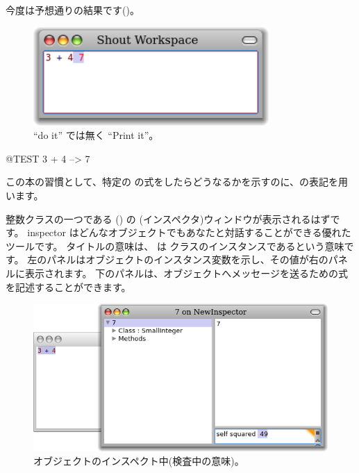 \documentclass[a4paper,10pt,twoside]{book}
\begin{document}
今度は予想通りの結果です()。

\begin{figure}[htb]
\centerline {\includegraphics[width=0.8\textwidth]{PrintIt}}
\caption{``do it'' では無く ``Print it''。}
\end{figure}

\begin{code}{@TEST}
3 + 4 --> 7
\end{code}
\noindent
この本の習慣として、特定の \pharo の式をしたらどうなるかを示すのに、\ct{-->}の表記を用います。

\noindent
整数クラスの一つである  () の (インスペクタ)ウィンドウが表示されるはずです。
inspector はどんなオブジェクトでもあなたと対話することができる優れたツールです。
タイトルの意味は、 は  クラスのインスタンスであるという意味です。
左のパネルはオブジェクトのインスタンス変数を示し、その値が右のパネルに表示されます。
下のパネルは、オブジェクトへメッセージを送るための式を記述することができます。

\begin{figure}[htb]
\centerline {\includegraphics[width=\textwidth]{InspectIt}}
\caption{オブジェクトのインスペクト中(検査中の意味)。 }
\end{figure}
\end{document}
